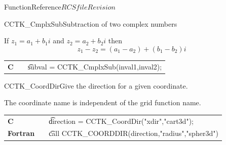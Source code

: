 \begin{cactuspart}{FunctionReference}{$RCSfile$}{$Revision$}
\begin{CCTKFunc}{CCTK\_CmplxSub}{Subtraction of two complex numbers}
\label{CCTK-CmplxSub}
\showcargs
\begin{params}
\end{params}
\begin{discussion}
If $z_1=a_1 + b_1 i$ and $z_2 = a_2+ b_2 i$ then
$$
z_1-z_2 = (a_1-a_2)+ (b_1 - b_2)i
$$
\end{discussion}
\begin{examples}
\begin{tabular}{@{}p{3cm}cp{11cm}}
\hfill {\bf C} && {\t subval = CCTK\_CmplxSub(inval1,inval2)};
\end{tabular}
\end{examples}
\begin{errorcodes}
\end{errorcodes}
\end{CCTKFunc}

\begin{CCTKFunc}{CCTK\_CoordDir}{Give the direction for a given coordinate.}
\label{CCTK-CoordDir}
\showargs
\begin{params}
\end{params}
\begin{discussion}
The coordinate name is independent of the grid function name.
\end{discussion}
\begin{examples}
\begin{tabular}{@{}p{3cm}cp{11cm}}
\hfill {\bf C} && {\t direction = CCTK\_CoordDir("xdir","cart3d")};
\\
\hfill {\bf Fortran} && {\t call  CCTK\_COORDDIR(direction,"radius","spher3d")}
\\
\end{tabular}
\end{examples}
\begin{errorcodes}
\end{errorcodes}
\end{CCTKFunc}


\end{cactuspart}
